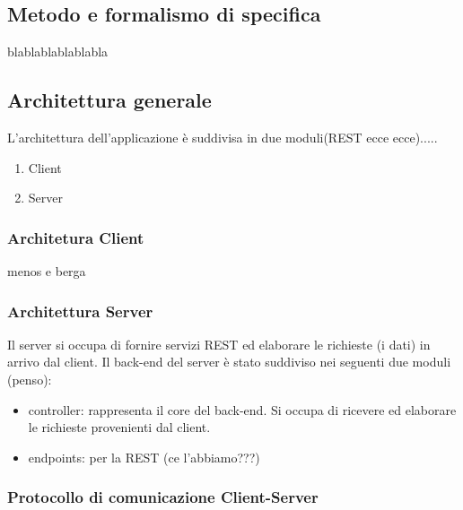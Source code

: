 
\subsection{Metodo e formalismo di specifica}
blablablablablabla
\subsection{Architettura generale}
L'architettura dell'applicazione è suddivisa in due moduli(REST ecce ecce).....
\begin{enumerate}
\item Client
\item Server
\end{enumerate}
\subsubsection{Architetura Client}
menos e berga
\subsubsection{Architettura Server}
Il server si occupa di fornire servizi REST ed elaborare le richieste (i dati) in arrivo dal client. Il back-end del server è stato suddiviso nei seguenti due moduli (penso):
\begin{itemize}
\item controller: rappresenta il core del back-end. Si occupa di ricevere ed elaborare le richieste provenienti dal client.
\item endpoints: per la REST (ce l'abbiamo???)
\end{itemize}
\subsubsection{Protocollo di comunicazione Client-Server}
